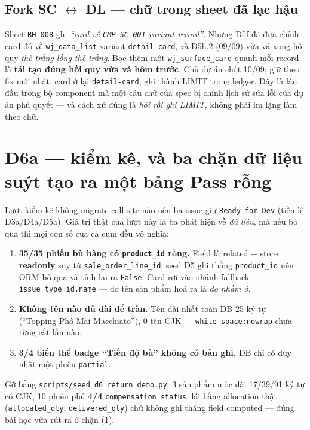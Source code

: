 \subsection*{Fork SC $\leftrightarrow$ DL --- chữ trong sheet đã lạc hậu}

Sheet \texttt{BH-008} ghi \emph{``card về \texttt{CMP-SC-001} variant record''}. Nhưng D5f đã đưa
chính card đó về \texttt{wj\_data\_list} variant \texttt{detail-card}, và D5h.2 (09/09) vừa vá xong
hồi quy \emph{thẻ trắng lồng thẻ trắng}. Bọc thêm một \texttt{wj\_surface\_card} quanh mỗi record
là \textbf{tái tạo đúng hồi quy vừa vá hôm trước}. Chủ dự án chốt 10/09: giữ theo fix mới nhất,
card ở lại \texttt{detail-card}, ghi thành LIMIT trong ledger. Đây là lần đầu trong bộ component
mà một câu chữ của spec bị chính lịch sử sửa lỗi của dự án phủ quyết --- và cách xử đúng là
\emph{hỏi rồi ghi LIMIT}, không phải im lặng làm theo chữ.

\section{D6a --- kiểm kê, và ba chặn dữ liệu suýt tạo ra một bảng Pass rỗng}

Lượt kiểm kê không migrate call site nào nên ba issue giữ \texttt{Ready for Dev} (tiền lệ
D3a/D4a/D5a). Giá trị thật của lượt này là ba phát hiện về \emph{dữ liệu}, mà nếu bỏ qua thì mọi
con số của cả cụm đều vô nghĩa:

\begin{enumerate}
\item \textbf{35/35 phiếu bù hàng có \texttt{product\_id} rỗng.} Field là related + store
  \textbf{readonly} suy từ \texttt{sale\_order\_line\_id}; seed D5 ghi thẳng \texttt{product\_id}
  nên ORM bỏ qua và tính lại ra \texttt{False}. Card rơi vào nhánh fallback
  \texttt{issue\_type\_id.name} --- đo tên sản phẩm hoá ra là \emph{đo nhầm ô}.
\item \textbf{Không tên nào đủ dài để tràn.} Tên dài nhất toàn DB 25 ký tự
  (``Topping Phô Mai Macchiato''), 0 tên CJK --- \texttt{white-space:nowrap} chưa từng cắt lần nào.
\item \textbf{3/4 biến thể badge ``Tiến độ bù'' không có bản ghi.} DB chỉ có duy nhất một phiếu
  \texttt{partial}.
\end{enumerate}

Gỡ bằng \texttt{scripts/seed\_d6\_return\_demo.py}: 3 sản phẩm mốc dài 17/39/91 ký tự có CJK,
10 phiếu phủ \textbf{4/4} \texttt{compensation\_status}, lái bằng allocation thật
(\texttt{allocated\_qty}, \texttt{delivered\_qty}) chứ không ghi thẳng field computed --- đúng bài
học vừa rút ra ở chặn (1).

